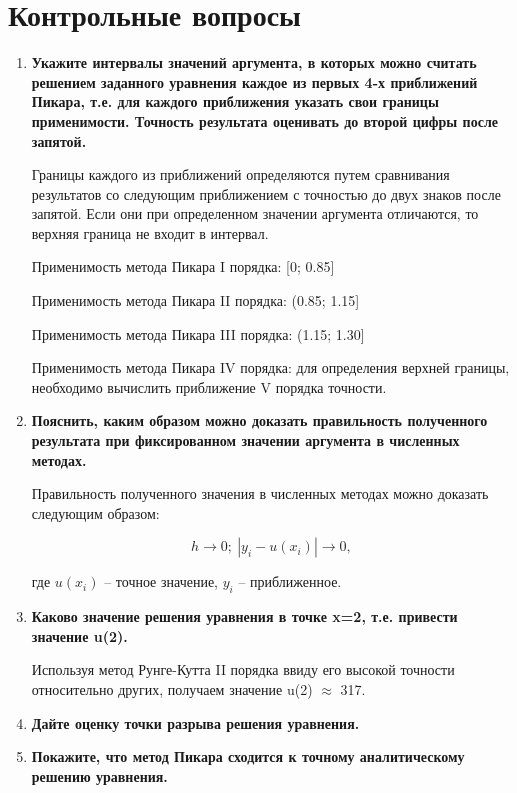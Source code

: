 \chapter{Контрольные вопросы}
\begin{enumerate}
	\item \textbf{Укажите интервалы значений аргумента, в которых можно считать решением заданного уравнения каждое из первых 4-х приближений Пикара, т.е. для каждого приближения указать свои границы применимости. Точность результата оценивать до второй цифры после запятой.}
	
	Границы каждого из приближений определяются путем сравнивания результатов со следующим приближением с точностью до двух знаков после запятой. Если они при определенном значении аргумента отличаются, то верхняя граница не входит в интервал.
	
	Применимость метода Пикара I порядка: [0; 0.85]
	
	Применимость метода Пикара II порядка: (0.85; 1.15]
	
	Применимость метода Пикара III порядка: (1.15; 1.30]
	
	Применимость метода Пикара IV порядка: для определения верхней границы, необходимо вычислить приближение V порядка точности.
	
	\item \textbf{Пояснить, каким образом можно доказать правильность полученного результата при фиксированном значении аргумента в численных методах.}
	
	Правильность полученного значения в численных методах можно доказать следующим образом:
	
	\begin{equation}
		h \rightarrow 0; \ |y_i - u(x_i)| \rightarrow 0,
	\end{equation}

	где $u(x_i)$  -- точное значение, $y_i$ -- приближенное.
	
	\item \textbf{Каково значение решения уравнения в точке x=2, т.е. привести значение u(2).}
	
	Используя метод Рунге-Кутта II порядка ввиду его высокой точности относительно других, получаем значение u(2) $\approx$ 317.
	
	\item \textbf{Дайте оценку точки разрыва решения уравнения.}
	
	\item \textbf{Покажите, что метод Пикара сходится к точному аналитическому решению уравнения.}
\end{enumerate}


 



